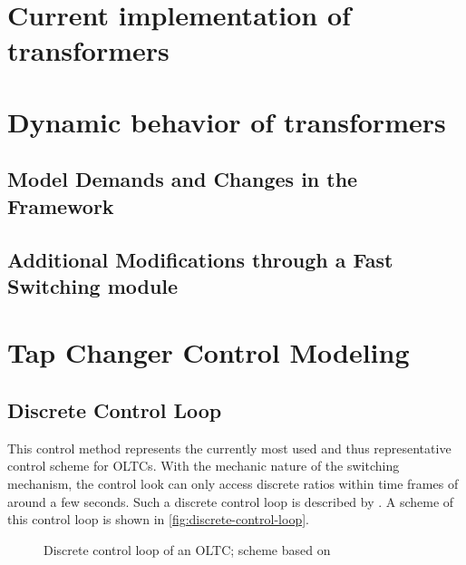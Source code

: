 \section{Current implementation of transformers}


\section{Dynamic behavior of transformers}


\subsection{Model Demands and Changes in the Framework}

\subsection{Additional Modifications through a Fast Switching module}

\section{Tap Changer Control Modeling}


\subsection{Discrete Control Loop}
This control method represents the currently most used and thus representative control scheme for \acsp{OLTC}. With the mechanic nature of the switching mechanism, the control look can only access discrete ratios within time frames of around a few seconds. Such a discrete control loop is described by \textcite{milanoHybridControlModel2011}. A scheme of this control loop is shown in \autoref{fig:discrete-control-loop}.

\begin{figure}[htb!]
        \centering
        \caption{Discrete control loop of an \acs{OLTC}; scheme based on \textcite{milanoHybridControlModel2011}}
        \label{fig:discrete-control-loop}
\end{figure}

